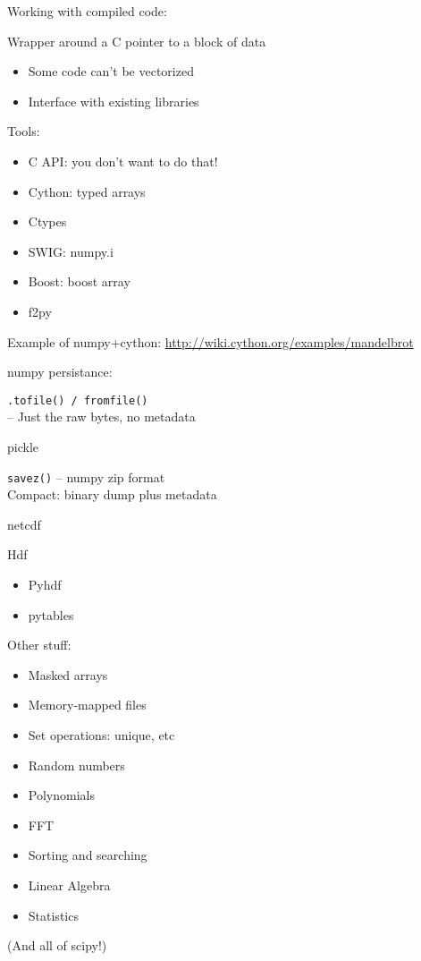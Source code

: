 \documentclass{beamer}
\begin{document}
\begin{frame}[fragile]{Working with compiled code:}

{\Large Wrapper around a C pointer to a block of data}

\begin{itemize}
  \item Some code can't be vectorized
  \item Interface with existing libraries
\end{itemize}

\vfill
{\Large Tools:}
\begin{itemize}
  \item C API: you don't want to do that!
  \item Cython: typed arrays
  \item Ctypes 
  \item SWIG: numpy.i 
  \item Boost: boost array
  \item f2py
\end{itemize}

\vfill
Example of numpy+cython: \url{http://wiki.cython.org/examples/mandelbrot}
\end{frame} 

\begin{frame}[fragile]{numpy persistance:}

{\Large \verb|.tofile() / fromfile()|}\\
 -- Just the raw bytes, no metadata

\vfill
{\Large pickle }

\vfill
{\Large \verb|savez()| -- numpy zip format}\\
Compact: binary dump plus metadata

\vfill
{\Large netcdf}

\vfill
{\Large Hdf}
\begin{itemize}
  \item Pyhdf
  \item pytables
\end{itemize}


\end{frame} 

\begin{frame}[fragile]{Other stuff:}

\begin{itemize}
  \item Masked arrays
  \item Memory-mapped files
  \item Set operations: unique, etc
  \item Random numbers
  \item Polynomials
  \item FFT
  \item Sorting and searching
  \item Linear Algebra
  \item Statistics
\end{itemize}

{\large (And all of scipy!)}

\end{frame} 
\end{document}
